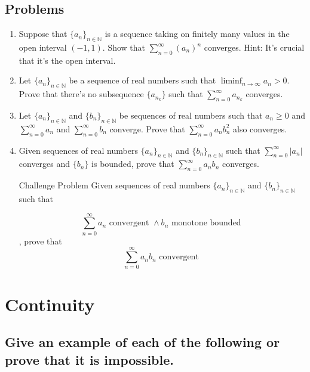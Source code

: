 \documentclass{article}
\theoremstyle{definition}
\begin{document}
\subsection{Problems}

\begin{enumerate}
    \item Suppose that $\{a_{n}\}_{n \in \mathbb{N}}$ is a sequence taking on finitely many values in the open interval $(-1,1)$. Show that $ \sum\limits_{n = 0}^\infty (a_{n})^{n}$ converges. Hint: It's crucial that it's the open interval.
    \item Let $\{a_{n}\}_{n \in \mathbb{N}}$ be a sequence of real numbers such that $\liminf_{n \to \infty} a_{n} > 0$. Prove that there's no subsequence $\{ a_{n_{k}}\}$ such that $ \sum\limits_{n = 0}^\infty a_{n_{k}}$ converges.
    \item Let $\{a_{n}\}_{n \in \mathbb{N}}$ and $\{b_{n}\}_{n \in \mathbb{N}}$ be sequences of real numbers such that $a_{n} \geq 0$ and $\sum\limits_{n = 0}^\infty a_{n}$ and $\sum\limits_{n = 0}^\infty b_{n}$ converge. Prove that $\sum\limits_{n = 0}^\infty a_{n}b_{n}^{2}$ also converges.

    \item Given sequences of real numbers $\{a_{n}\}_{n \in \mathbb{N}}$ and $\{b_{n}\}_{n \in \mathbb{N}}$ such that $\sum\limits_{n = 0}^\infty \lvert a_{n} \rvert $ converges and $\{ b_{n} \}$ is bounded, prove that $\sum\limits_{n = 0}^\infty a_{n} b_{n}$ converges. 
    \item[Challenge Problem] Given sequences of real numbers $\{a_{n}\}_{n \in \mathbb{N}}$ and $\{b_{n}\}_{n \in \mathbb{N}}$ such that 

    \[ \sum\limits_{n = 0}^\infty a_{n} \text{ convergent } \land b_{n} \text{ monotone bounded }\], prove that \[\sum\limits_{n = 0}^\infty a_{n}b_{n} \text{ convergent }\]

\end{enumerate}

\newpage

\section{Continuity}

\subsection{Give an example of each of the following or prove that it is impossible.}
\end{document}
